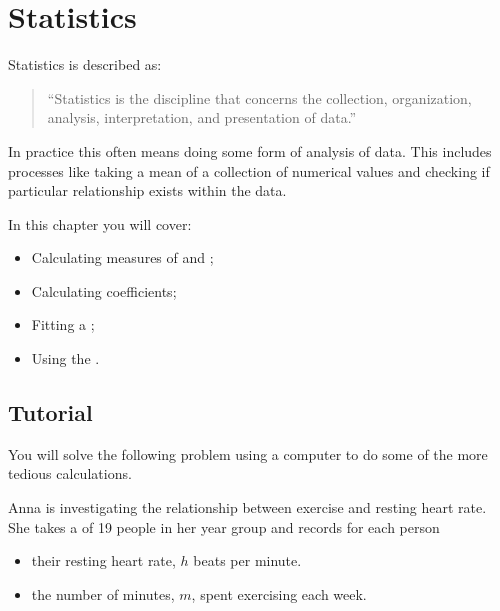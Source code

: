 \chapter{Statistics}
\label{chp:statistics}

Statistics is described as:
\begin{quote}
``Statistics is the discipline that concerns the collection, organization,
analysis, interpretation, and presentation of data.''
\end{quote}


In practice this often means doing some form of analysis of data.
This includes processes like taking a mean of a collection of numerical
values and checking if particular relationship exists within the data.


\begin{note}
In this chapter you will cover:
\begin{itemize}
\item 

Calculating measures of  and ;

\item 

Calculating  coefficients;

\item 

Fitting a ;

\item 

Using the .

\end{itemize}
\end{note}





\section{Tutorial}

You will solve the following problem using a computer to do some of the more
tedious calculations.

Anna is investigating the relationship between exercise and resting heart rate.
She takes a  of 19 people in her year group and records for each person
\begin{itemize}
\item 

their resting heart rate, \(h\) beats per minute.

\item 

the number of minutes, \(m\), spent exercising each week.

\end{itemize}


